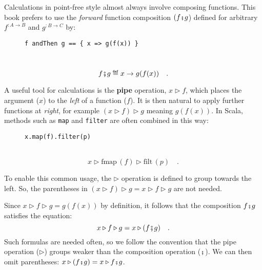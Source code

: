 Calculations in point-free style almost always involve composing functions.
This book prefers to use the \emph{forward} function composition $(f\bef g$)
defined for arbitrary $f^{:A\rightarrow B}$ and $g^{:B\rightarrow C}$
by:

\begin{wrapfigure}{l}{0.5\columnwidth}%
\vspace{-0.65\baselineskip}
\begin{lstlisting}
f andThen g == { x => g(f(x)) }
\end{lstlisting}

\vspace{-0.25\baselineskip}
\end{wrapfigure}%

~\vspace{-0.35\baselineskip}
\[
f\bef g\triangleq x\rightarrow g(f(x))\quad.
\]
\vspace{-0.85\baselineskip}

A useful tool for calculations is the \textbf{pipe}
operation, $x\triangleright f$, which places the argument ($x$)
to the \emph{left} of a function ($f$). It is then natural to apply
further functions at \emph{right}, for example $(x\triangleright f)\triangleright g$
meaning $g(f(x))$. In Scala, methods such as \lstinline!map! and
\lstinline!filter! are often combined in this way:

\begin{wrapfigure}{l}{0.5\columnwidth}%
\vspace{-0.65\baselineskip}
\begin{lstlisting}
x.map(f).filter(p)
\end{lstlisting}

\vspace{-0.25\baselineskip}
\end{wrapfigure}%

~\vspace{-0.35\baselineskip}
\[
x\triangleright\text{fmap}\,(f)\triangleright\text{filt}\,(p)\quad.
\]
\vspace{-0.85\baselineskip}

To enable this common usage, the $\triangleright$ operation is defined
to group towards the left. So, the parentheses in $(x\triangleright f)\triangleright g=x\triangleright f\triangleright g$
are not needed.

Since $x\triangleright f\triangleright g=g(f(x))$ by definition,
it follows that the composition $f\bef g$ satisfies the equation:
\[
x\triangleright f\triangleright g=x\triangleright(f\bef g)\quad.
\]
Such formulas are needed often, so we follow the convention that the
pipe operation ($\triangleright$) groups weaker than the composition
operation ($\bef$). We
can then omit parentheses: $x\triangleright(f\bef g)=x\triangleright f\bef g$. 

